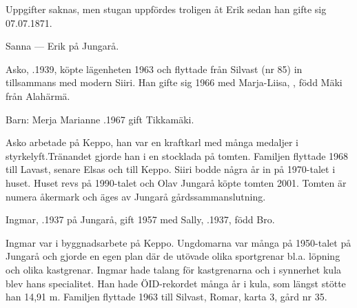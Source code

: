 Uppgifter saknas, men stugan uppfördes troligen åt Erik sedan han gifte sig 07.07.1871.

Sanna   ---  Erik  på Jungarå.






Asko, .1939, köpte lägenheten 1963 och flyttade från Silvast (nr 85) in tillsammans med modern Siiri. Han gifte sig 1966 med Marja-Liisa, , född Mäki från Alahärmä.

Barn: Merja Marianne .1967 gift Tikkamäki.

Asko arbetade på Keppo, han var en kraftkarl med många medaljer i styrkelyft.Tränandet gjorde han i en stocklada på tomten. Familjen flyttade 1968 till Lavast, senare Elsas och till Keppo. Siiri bodde några år in på 1970-talet i huset. Huset revs på 1990-talet och Olav Jungarå köpte tomten 2001. Tomten är numera åkermark och äges av Jungarå gårdssammanslutning.


Ingmar, .1937 på Jungarå, gift 1957 med Sally, .1937, född Bro.
\begin{jhchildren}
  \item {}
  \item {}
  \item {}
  \item {}
  \item {}
\end{jhchildren}
Ingmar var i byggnadsarbete på Keppo. Ungdomarna var många på 1950-talet på Jungarå och gjorde en egen plan där de utövade olika sportgrenar bl.a. löpning och olika kastgrenar. Ingmar hade talang för kastgrenarna och i synnerhet kula blev hans specialitet. Han hade ÖID-rekordet många år i kula, som längst stötte han 14,91 m. Familjen flyttade 1963 till Silvast, Romar, karta 3, gård nr 35.


